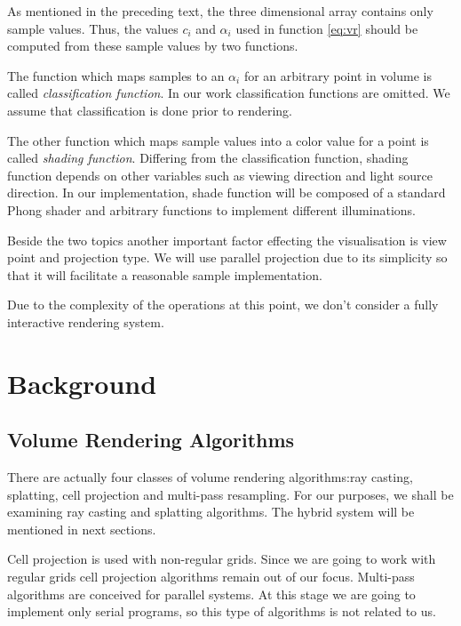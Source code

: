 \documentclass[a4paper,12pt]{article}
\begin{document}
As mentioned in the preceding text, the three dimensional array
contains only sample values. Thus, the values $c_{i}$ and $\alpha_{i}$
used in function \ref{eq:vr} should be computed from these sample
values by two functions.

The function which maps samples to an $\alpha_{i}$ for an arbitrary point
in volume is called
\emph{classification function}. In our work classification functions
are omitted. We assume that classification is done prior to rendering.

The other function which maps sample values into a color value for
a point is called \emph{shading function}. Differing from the classification
function, shading function depends on other variables such
as viewing direction and light source direction. In our implementation, shade
function will be composed of a standard Phong shader and
arbitrary functions to implement different illuminations.

Beside the two topics another important factor effecting the
visualisation is view point and projection type. We will use parallel
projection due to its simplicity so that it will facilitate a reasonable
sample implementation.

Due to the complexity of the operations at this point, we don't
consider a fully interactive rendering system.
    
\section{Background}
  
\subsection{Volume Rendering Algorithms}  

There are actually four classes of volume rendering algorithms:ray
casting, splatting, cell projection and multi-pass resampling. For our
purposes, we shall be examining ray casting and splatting
algorithms. The hybrid system will be mentioned in next sections.

Cell projection is used with non-regular grids. Since we are going to
work with regular grids cell projection algorithms remain out of our
focus.  Multi-pass algorithms are conceived for parallel systems.
At this stage we are going to implement only serial programs, so
this type of algorithms is not related to us.
\end{document}
